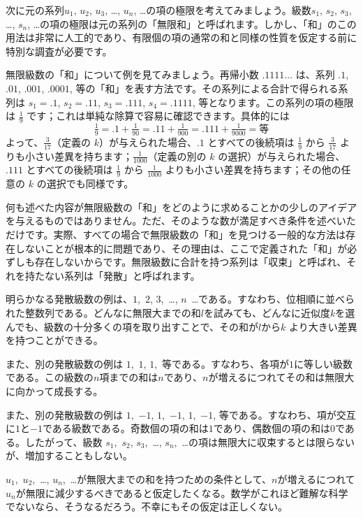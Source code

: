 \documentclass[a4paper,11pt,openany]{ltjsbook}
\begin{document}
次に元の系列$u_{1}$, $u_{2}$, $u_{3}$, \dots, $u_{n}$, \dots の項の極限を考えてみましょう。級数$s_{1}$, $s_{2}$, $s_{3}$, \dots, $s_{n}$, \dots の項の極限は元の系列の「無限和」と呼ばれます。しかし、「和」のこの用法は非常に人工的であり、有限個の項の通常の和と同様の性質を仮定する前に特別な調査が必要です。

無限級数の「和」について例を見てみましょう。再帰小数 $.1111\dots$ は、系列 $.1$, $.01$, $.001$, $.0001$, 等の「和」を表す方法です。その系列による合計で得られる系列は $s_{1} = .1$, $s_{2} = .11$, $s_{3} = .111$, $s_{4} = .1111$, 等となります。この系列の項の極限は $\frac{1}{9}$ です；これは単純な除算で容易に確認できます。具体的には
\[
\tfrac{1}{9}
  = .1 + \tfrac{1}{90}
  = .11 + \tfrac{1}{900}
  = .111 + \tfrac{1}{9000} = \text{等}
\]
よって、$\frac{3}{17}$（定義の $k$）が与えられた場合、$.1$ とすべての後続項は $\frac{1}{9}$ から $\frac{3}{17}$ よりも小さい差異を持ちます；$\frac{1}{1000}$（定義の別の $k$ の選択）が与えられた場合、$.111$ とすべての後続項は $\frac{1}{9}$ から $\frac{1}{1000}$ よりも小さい差異を持ちます；その他の任意の $k$ の選択でも同様です。

何も述べた内容が無限級数の「和」をどのように求めることかの少しのアイデアを与えるものではありません。ただ、そのような数が満足すべき条件を述べいただけです。実際、すべての場合で無限級数の「和」を見つける一般的な方法は存在しないことが根本的に問題であり、その理由は、ここで定義された「和」が必ずしも存在しないからです。無限級数に合計を持つ系列は「収束」と呼ばれ、それを持たない系列は「発散」と呼ばれます。

明らかなる発散級数の例は、$1$,~$2$, $3$,~\dots, $n$~\dots である。すなわち、位相順に並べられた整数列である。どんなに無限大までの和$l$を試みても、どんなに近似度$k$を選んでも、級数の十分多くの項を取り出すことで、その和が$l$から$k$ より大きい差異を持つことができる。

また、別の発散級数の例は $1$,~$1$, $1$,~等である。すなわち、各項が$1$に等しい級数である。この級数の$n$項までの和は$n$であり、$n$が増えるにつれてその和は無限大に向かって成長する。

また、別の発散級数の例は $1$,~$-1$, $1$,~$-1$, $1$,~$-1$, 等である。すなわち、項が交互に$1$と$-1$である級数である。奇数個の項の和は$1$であり、偶数個の項の和は$0$である。したがって、級数 $s_{1}$,~$s_{2}$, $s_{3}$,~\dots, $s_{n}$,~\dots の項は無限大に収束するとは限らないが、増加することもしない。

$u_{1}$,~$u_{2}$,~\dots, $u_{n}$,~\dots が無限大までの和を持つための条件として、$n$が増えるにつれて$u_{n}$が無限に減少するべきであると仮定したくなる。数学がこれほど難解な科学でないなら、そうなるだろう。不幸にもその仮定は正しくない。
\end{document}
